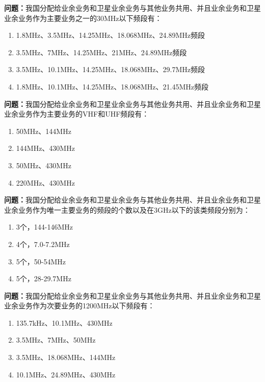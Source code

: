 \bigskip


\noindent\textbf{问题：}我国分配给业余业务和卫星业余业务与其他业务共用、并且业余业务和卫星业余业务作为主要业务之一的30MHz以下频段有：
\begin{enumerate}[label=\Alph*), leftmargin=3em]
\item 1.8MHz、3.5MHz、14.25MHz、18.068MHz、24.89MHz频段
\item 3.5MHz、7MHz、14.25MHz、21MHz、24.89MHz频段
\item 3.5MHz、10.1MHz、14.25MHz、18.068MHz、29.7MHz频段
\item 1.8MHz、10.1MHz、14.25MHz、18.068MHz、21.45MHz频段
\end{enumerate}

\bigskip


\noindent\textbf{问题：}我国分配给业余业务和卫星业余业务与其他业务共用、并且业余业务和卫星业余业务作为主要业务的VHF和UHF频段有：
\begin{enumerate}[label=\Alph*), leftmargin=3em]
\item 50MHz、144MHz
\item 144MHz、430MHz
\item 50MHz、430MHz
\item 220MHz、430MHz
\end{enumerate}

\bigskip


\noindent\textbf{问题：}我国分配给业余业务和卫星业余业务与其他业务共用、并且业余业务和卫星业余业务作为唯一主要业务的频段的个数以及在3GHz以下的该类频段分别为：
\begin{enumerate}[label=\Alph*), leftmargin=3em]
\item 3个，144-146MHz
\item 4个，7.0-7.2MHz
\item 5个，50-54MHz
\item 5个，28-29.7MHz
\end{enumerate}

\bigskip


\noindent\textbf{问题：}我国分配给业余业务和卫星业余业务与其他业务共用、并且业余业务和卫星业余业务作为次要业务的1200MHz以下频段有：
\begin{enumerate}[label=\Alph*), leftmargin=3em]
\item 135.7kHz、10.1MHz、430MHz
\item 3.5MHz、7MHz、50MHz
\item 3.5MHz、18.068MHz、144MHz
\item 10.1MHz、24.89MHz、430MHz
\end{enumerate}

